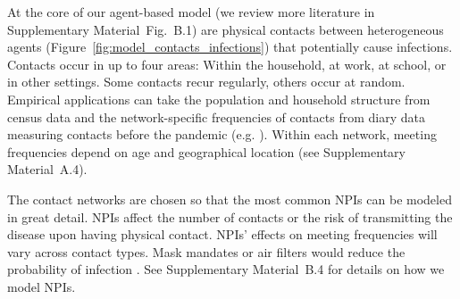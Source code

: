 \documentclass[12pt]{article}
\begin{document}
At the core of our agent-based model \cite{Aleta2020,Hinch2020} (we review more
literature in Supplementary Material~Fig.~B.1) are physical contacts
between heterogeneous agents (Figure~\ref{fig:model_contacts_infections}) that
potentially cause infections. Contacts occur in up to four areas: Within the
household, at work, at school, or in other settings. Some contacts recur regularly,
others occur at random. Empirical applications can take the population and household
structure from census data and the network-specific frequencies of contacts from diary
data measuring contacts before the pandemic (e.g. \cite{Mossong2008,Hoang2019}). Within
each network, meeting frequencies depend on age and geographical location (see
Supplementary Material~A.4).

The contact networks are chosen so that the most common NPIs can be modeled in great
detail. NPIs affect the number of contacts or the risk of transmitting the disease upon
having physical contact. NPIs' effects on meeting frequencies will vary across contact
types. Mask mandates or air filters would reduce the probability of infection
\cite{Lessler2021, Cheng2021}. See Supplementary Material~B.4 for
details on how we model NPIs.
\end{document}
